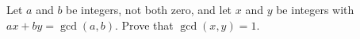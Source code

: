 Let $a$ and $b$ be integers, not both zero, and let $x$ and $y$ be integers with $ax+by=\gcd(a,b)$. Prove that $\gcd(x,y)=1$.
